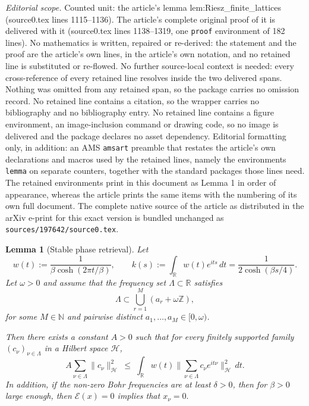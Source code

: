 \documentclass[10pt,a4paper]{amsart}
\newtheorem{lemma}{Lemma}
\begin{document}
\noindent\textit{Editorial scope.} Counted unit: the article's lemma lem:Riesz\_finite\_lattices (source0.tex lines 1115--1136). The article's complete original proof of it is delivered with it (source0.tex lines 1138--1319, one \texttt{proof} environment of 182 lines). No mathematics is written, repaired or re-derived: the statement and the proof are the article's own lines, in the article's own notation, and no retained line is substituted or re-flowed.  No further source-local context is needed: every cross-reference of every retained line resolves inside the two delivered spans.  Nothing was omitted from any retained span, so the package carries no omission record.  No retained line contains a citation, so the wrapper carries no bibliography and no bibliography entry.  No retained line contains a figure environment, an image-inclusion command or drawing code, so no image is delivered and the package declares no asset dependency.  Editorial formatting only, in addition: an AMS \texttt{amsart} preamble that restates the article's own declarations and macros used by the retained lines, namely the environments \texttt{lemma} on separate counters, together with the standard packages those lines need.  The retained environments print in this document as Lemma 1 in order of appearance, whereas the article prints the same items with the numbering of its own full document.  The complete native source of the article as distributed in the arXiv e-print for this exact version is bundled unchanged as \texttt{sources/197642/source0.tex}.
\begin{lemma}[Stable phase retrieval]\label{lem:Riesz_finite_lattices}
Let
\[
w(t):=\frac{1}{\beta\cosh(2\pi t/\beta)}, 
\qquad
k(s):=\int_{\mathbb R} w(t)e^{its}\,dt
= \frac{1}{2\cosh(\beta s/4)}.
\]
Let $\omega>0$ and assume that the frequency set $\Lambda\subset\mathbb R$ satisfies
\[
\Lambda \subset \bigcup_{r=1}^M (a_r+\omega\mathbb Z),
\]
for some $M\in\mathbb N$ and pairwise distinct $a_1,\dots,a_M\in[0,\omega)$.

Then there exists a constant $A>0$ such that for every finitely supported family $(c_\nu)_{\nu\in\Lambda}$ in a Hilbert space $\mathcal H$,
\begin{equation}\label{eq:Riesz_lower}
A \sum_{\nu\in\Lambda} \|c_\nu\|_{\mathcal H}^2
\;\le\;
\int_{\mathbb R} w(t)\Big\|\sum_{\nu\in\Lambda} c_\nu e^{it\nu}\Big\|_{\mathcal H}^2\,dt.
\end{equation}
In addition, if the non-zero Bohr frequencies are at least $\delta>0$, then for $\beta>0$ large enough, then $\mathcal E(x)=0$ implies that $x_{\nu}=0.$
\end{lemma}
\end{document}
